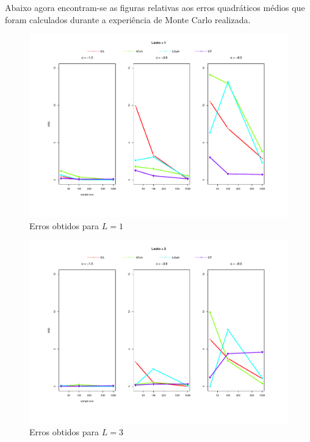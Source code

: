 \documentclass[12pt]{article}
\begin{document}
Abaixo agora encontram-se as figuras relativas aos erros quadráticos médios que foram calculados durante a experiência de Monte Carlo realizada. 
\begin{figure}[H]
     \centering
     \includegraphics[scale=0.5]{plots/mse_L=1.pdf}
     \caption{Erros obtidos para $L=1$}
     \label{graf_12}
\end{figure}
\begin{figure}[H]
     \centering
     \includegraphics[scale=0.5]{plots/mse_L=3.pdf}
     \caption{Erros obtidos para $L=3$}
     \label{graf_13}
\end{figure}
\end{document}
